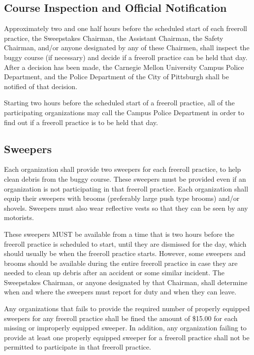 \documentclass[openany]{book}
\begin{document}
\subsection{Course Inspection and Official Notification}

Approximately two and one half hours before the scheduled start of each freeroll practice, the Sweepstakes Chairman, the Assistant Chairman, the Safety Chairman, and/or anyone designated by any of these Chairmen, shall inspect the buggy course (if necessary) and decide if a freeroll practice can be held that day. After a decision has been made, the Carnegie Mellon University Campus Police Department, and the Police Department of the City of Pittsburgh shall be notified of that decision.

Starting two hours before the scheduled start of a freeroll practice, all of the participating organizations may call the Campus Police Department in order to find out if a freeroll practice is to be held that day.

\subsection{Sweepers}

Each organization shall provide two sweepers for each freeroll practice, to help clean debris from the buggy course. These sweepers must be provided even if an organization is not participating in that freeroll practice. Each organization shall equip their sweepers with brooms (preferably large push type brooms) and/or shovels. Sweepers must also wear reflective vests so that they can be seen by any motorists.

These sweepers MUST be available from a time that is two hours before the freeroll practice is scheduled to start, until they are dismissed for the day, which should usually be when the freeroll practice starts. However, some sweepers and brooms should be available during the entire freeroll practice in case they are needed to clean up debris after an accident or some similar incident. The Sweepstakes Chairman, or anyone designated by that Chairman, shall determine when and where the sweepers must report for duty and when they can leave.

Any organizations that fails to provide the required number of properly equipped sweepers for any freeroll practice shall be fined the amount of \$15.00 for each missing or improperly equipped sweeper. In addition, any organization failing to provide at least one properly equipped sweeper for a freeroll practice shall not be permitted to participate in that freeroll practice.
\end{document}
